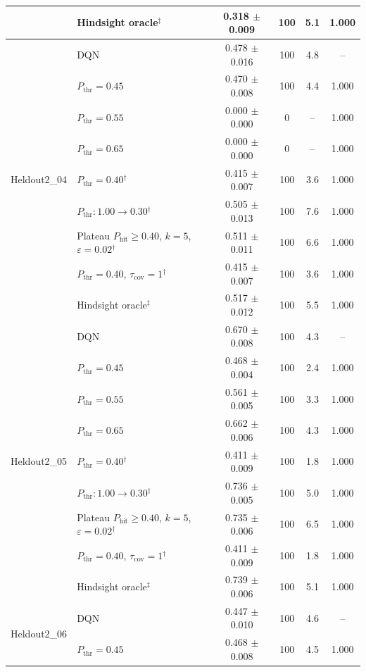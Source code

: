 \begin{table}[htbp]
\begin{tabular}{llcccc}
 & Hindsight oracle$^{\ddagger}$ & 0.318 $\pm$ 0.009 & 100 & 5.1 & 1.000 \\
\midrule
\multirow{9}{*}{Heldout2\_04} & DQN & 0.478 $\pm$ 0.016 & 100 & 4.8 & -- \\
 & $P_{\mathrm{thr}}=0.45$ & 0.470 $\pm$ 0.008 & 100 & 4.4 & 1.000 \\
 & $P_{\mathrm{thr}}=0.55$ & 0.000 $\pm$ 0.000 & 0 & -- & 1.000 \\
 & $P_{\mathrm{thr}}=0.65$ & 0.000 $\pm$ 0.000 & 0 & -- & 1.000 \\
 & $P_{\mathrm{thr}}=0.40$$^{\dagger}$ & 0.415 $\pm$ 0.007 & 100 & 3.6 & 1.000 \\
 & $P_{\mathrm{thr}}: 1.00 \to 0.30$$^{\dagger}$ & 0.505 $\pm$ 0.013 & 100 & 7.6 & 1.000 \\
 & Plateau $P_{\mathrm{hit}}\geq0.40$, $k=5$, $\varepsilon=0.02$$^{\dagger}$ & 0.511 $\pm$ 0.011 & 100 & 6.6 & 1.000 \\
 & $P_{\mathrm{thr}}=0.40$, $\tau_{\mathrm{cov}}=1$$^{\dagger}$ & 0.415 $\pm$ 0.007 & 100 & 3.6 & 1.000 \\
 & Hindsight oracle$^{\ddagger}$ & 0.517 $\pm$ 0.012 & 100 & 5.5 & 1.000 \\
\midrule
\multirow{9}{*}{Heldout2\_05} & DQN & 0.670 $\pm$ 0.008 & 100 & 4.3 & -- \\
 & $P_{\mathrm{thr}}=0.45$ & 0.468 $\pm$ 0.004 & 100 & 2.4 & 1.000 \\
 & $P_{\mathrm{thr}}=0.55$ & 0.561 $\pm$ 0.005 & 100 & 3.3 & 1.000 \\
 & $P_{\mathrm{thr}}=0.65$ & 0.662 $\pm$ 0.006 & 100 & 4.3 & 1.000 \\
 & $P_{\mathrm{thr}}=0.40$$^{\dagger}$ & 0.411 $\pm$ 0.009 & 100 & 1.8 & 1.000 \\
 & $P_{\mathrm{thr}}: 1.00 \to 0.30$$^{\dagger}$ & 0.736 $\pm$ 0.005 & 100 & 5.0 & 1.000 \\
 & Plateau $P_{\mathrm{hit}}\geq0.40$, $k=5$, $\varepsilon=0.02$$^{\dagger}$ & 0.735 $\pm$ 0.006 & 100 & 6.5 & 1.000 \\
 & $P_{\mathrm{thr}}=0.40$, $\tau_{\mathrm{cov}}=1$$^{\dagger}$ & 0.411 $\pm$ 0.009 & 100 & 1.8 & 1.000 \\
 & Hindsight oracle$^{\ddagger}$ & 0.739 $\pm$ 0.006 & 100 & 5.1 & 1.000 \\
\midrule
\multirow{9}{*}{Heldout2\_06} & DQN & 0.447 $\pm$ 0.010 & 100 & 4.6 & -- \\
 & $P_{\mathrm{thr}}=0.45$ & 0.468 $\pm$ 0.008 & 100 & 4.5 & 1.000 \\

\end{tabular}
\end{table}
